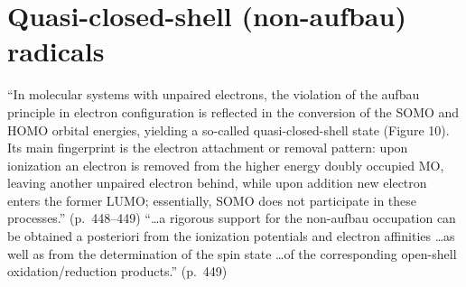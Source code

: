 \section{Quasi-closed-shell (non-aufbau) radicals}\label{sec:qcs}

\begin{reviewclaim}
``In molecular systems with unpaired electrons, the violation of the aufbau principle in electron
configuration is reflected in the conversion of the SOMO and HOMO orbital energies, yielding a so-called
quasi-closed-shell state (Figure 10). Its main fingerprint is the electron attachment or removal pattern:
upon ionization an electron is removed from the higher energy doubly occupied MO, leaving another
unpaired electron behind, while upon addition new electron enters the former LUMO; essentially, SOMO does
not participate in these processes.'' (p.~448--449) ``\dots a rigorous support for the non-aufbau
occupation can be obtained a posteriori from the ionization potentials and electron affinities \dots as
well as from the determination of the spin state \dots of the corresponding open-shell
oxidation/reduction products.'' (p.~449)
\end{reviewclaim}

